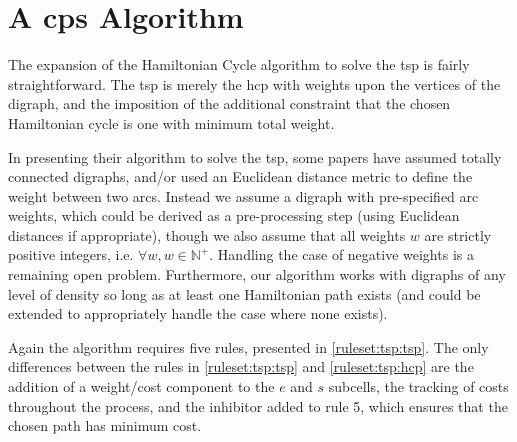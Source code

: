 \section{\label{sec:tsp:algotsp}A \texorpdfstring{\gls{cps}}{cP systems} \texorpdfstring{}{Travelling Salesman Problem} Algorithm}

The expansion of the Hamiltonian Cycle algorithm to solve the \gls{tsp} is fairly straightforward.  The \gls{tsp} is merely the \gls{hcp} with weights upon the vertices of the digraph, and the imposition of the additional constraint that the chosen Hamiltonian cycle is one with minimum total weight.  

In presenting their algorithm to solve the \gls{tsp}, some papers have assumed totally connected digraphs, and/or used an Euclidean distance metric to define the weight between two arcs.  Instead we assume a digraph with pre-specified arc weights, which could be derived as a pre-processing step (using Euclidean distances if appropriate), though we also assume that all weights \(w\) are strictly positive integers, i.e. \(\forall w, w \in \mathbb{N^+}\).  Handling the case of negative weights is a remaining open problem.  Furthermore, our algorithm works with digraphs of any level of density so long as at least one Hamiltonian path exists (and could be extended to appropriately handle the case where none exists).


Again the algorithm requires five rules, presented in \cref{ruleset:tsp:tsp}.  The only differences between the rules in \cref{ruleset:tsp:tsp} and \cref{ruleset:tsp:hcp} are the addition of a weight/cost component to the \(e\) and \(s\) subcells, the tracking of costs throughout the process, and the inhibitor added to rule 5, which ensures that the chosen path has minimum cost.

\cpresetrulenumber

